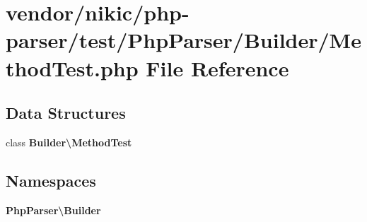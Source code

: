 \section{vendor/nikic/php-\/parser/test/\+Php\+Parser/\+Builder/\+Method\+Test.php File Reference}
\label{_method_test_8php}
\subsection*{Data Structures}
\begin{DoxyCompactItemize}
\item 
class {\bf Builder\textbackslash{}\+Method\+Test}
\end{DoxyCompactItemize}
\subsection*{Namespaces}
\begin{DoxyCompactItemize}
\item 
 {\bf Php\+Parser\textbackslash{}\+Builder}
\end{DoxyCompactItemize}
